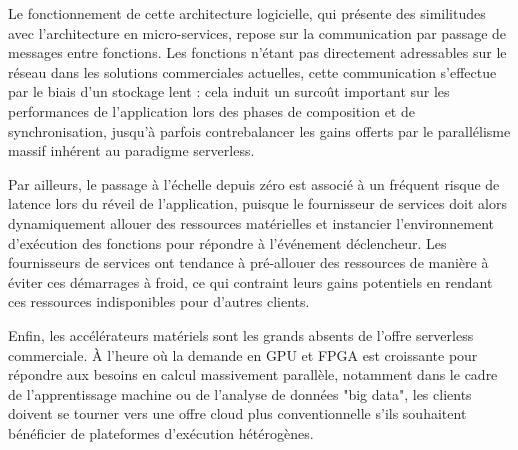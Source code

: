 Le fonctionnement de cette architecture logicielle, qui présente des similitudes avec l'architecture en micro-services, repose sur la communication par passage de messages entre fonctions. Les fonctions n'étant pas directement adressables sur le réseau dans les solutions commerciales actuelles, cette communication s'effectue par le biais d'un stockage lent : cela induit un surcoût important sur les performances de l'application lors des phases de composition et de synchronisation, jusqu'à parfois contrebalancer les gains offerts par le parallélisme massif inhérent au paradigme serverless.

Par ailleurs, le passage à l'échelle depuis zéro est associé à un fréquent risque de latence lors du réveil de l'application, puisque le fournisseur de services doit alors dynamiquement allouer des ressources matérielles et instancier l'environnement d'exécution des fonctions pour répondre à l'événement déclencheur. Les fournisseurs de services ont tendance à pré-allouer des ressources de manière à éviter ces démarrages à froid, ce qui contraint leurs gains potentiels en rendant ces ressources indisponibles pour d'autres clients.

Enfin, les accélérateurs matériels sont les grands absents de l'offre serverless commerciale. À l'heure où la demande en GPU et FPGA est croissante pour répondre aux besoins en calcul massivement parallèle, notamment dans le cadre de l'apprentissage machine ou de l'analyse de données "big data", les clients doivent se tourner vers une offre cloud plus conventionnelle s'ils souhaitent bénéficier de plateformes d'exécution hétérogènes.
